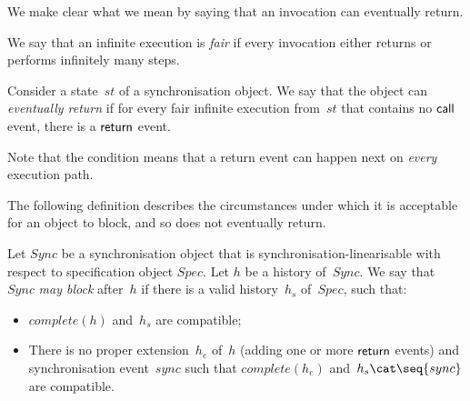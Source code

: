 We make clear what we mean by saying that an invocation can eventually return.
%
\begin{definition}
We say that an infinite execution is \emph{fair} if every  invocation
either returns or performs infinitely many steps.

Consider a state~$st$ of a synchronisation object.  We say that the object can
\emph{eventually return} if for every fair infinite execution from~$st$ that
contains no $\mathsf{call}$ event, there is a $\mathsf{return}$ event.
\end{definition}
%
Note that the condition means that a return event can happen next on
\emph{every} execution path.






The following definition describes the circumstances under which it is
acceptable for an object to block, and so does not eventually return.
%
\begin{definition}
Let $Sync$ be a synchronisation object that is synchronisation-linearisable
with respect to specification object $Spec$.  Let $h$ be a history of~$Sync$.
We say that $Sync$ \emph{may block} after~$h$ if there is a valid
history~$h_s$ of~$Spec$, such that:
%
\begin{itemize}
\item $complete(h)$ and~$h_s$ are compatible;

\item There is no proper extension~$h_e$ of~$h$ (adding one or more $\mathsf{return}$
  events) and synchronisation event~$sync$ such that $complete(h_e)$ and~$h_s
  \cat \seq{sync}$ are compatible.
\end{itemize}
\end{definition}

